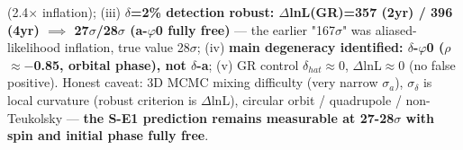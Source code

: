 \documentclass[12pt]{article}
\newcommand{\down}[1]{\ensuremath{_{#1}}}
\begin{document}
(2.4\ensuremath{\times} inflation); (iii) \textbf{\ensuremath{\delta}=2\% detection robust: \ensuremath{\Delta}lnL(GR)=357 (2yr) / 396 (4yr) \ensuremath{\implies} 27\ensuremath{\sigma}/28\ensuremath{\sigma} (a-\ensuremath{\varphi}0 fully free)} --- the earlier "167\ensuremath{\sigma}" was aliased-likelihood inflation, true value 28\ensuremath{\sigma}; (iv) \textbf{main degeneracy identified: \ensuremath{\delta}-\ensuremath{\varphi}0 (\ensuremath{\rho}\ensuremath{\approx}\ensuremath{-}0.85, orbital phase), not \ensuremath{\delta}-a}; (v) GR control \ensuremath{\delta}\down{hat}\ensuremath{\approx}0, \ensuremath{\Delta}lnL\ensuremath{\approx}0 (no false positive). Honest caveat: 3D MCMC mixing difficulty (very narrow \ensuremath{\sigma}\down{a}), \ensuremath{\sigma}\down{\delta{}} is local curvature (robust criterion is \ensuremath{\Delta}lnL), circular orbit / quadrupole / non-Teukolsky --- \textbf{the S-E1 prediction remains measurable at 27-28\ensuremath{\sigma} with spin and initial phase fully free}.
\end{document}
